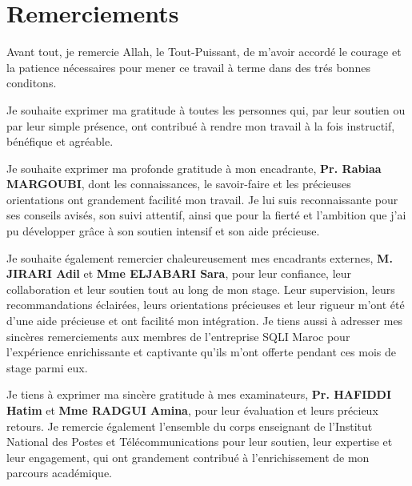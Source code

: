 \chapter*{Remerciements}



Avant tout, je remercie Allah, le Tout-Puissant, de m'avoir accordé le courage et la patience nécessaires pour mener ce travail à terme dans des trés bonnes conditons.

\vspace{10pt}
Je souhaite exprimer ma gratitude à toutes les personnes qui, par leur soutien ou par leur simple présence, ont contribué à rendre mon travail à la fois instructif, bénéfique et agréable.

\vspace{10pt}
Je souhaite exprimer ma profonde gratitude à mon encadrante, \textbf{Pr. Rabiaa MARGOUBI}, dont les connaissances, le savoir-faire et les précieuses orientations ont grandement facilité mon travail. Je lui suis reconnaissante pour ses conseils avisés, son suivi attentif, ainsi que pour la fierté et l'ambition que j'ai pu développer grâce à son soutien intensif et son aide précieuse.

\vspace{10pt}
Je souhaite également remercier chaleureusement mes encadrants externes, \textbf{M. JIRARI Adil} et \textbf{Mme ELJABARI Sara}, pour leur confiance, leur collaboration et leur soutien tout au long de mon stage. Leur supervision, leurs recommandations éclairées, leurs orientations précieuses et leur rigueur m'ont été d'une aide précieuse et ont facilité mon intégration. Je tiens aussi à adresser mes sincères remerciements aux membres de l'entreprise SQLI Maroc pour l'expérience enrichissante et captivante qu'ils m'ont offerte pendant ces mois de stage parmi eux.

\vspace{10pt}
Je tiens à exprimer ma sincère gratitude à mes examinateurs, \textbf{Pr. HAFIDDI Hatim} et \textbf{Mme RADGUI Amina}, pour leur évaluation et leurs précieux retours. Je remercie également l'ensemble du corps enseignant de l’Institut National des Postes et Télécommunications pour leur soutien, leur expertise et leur engagement, qui ont grandement contribué à l’enrichissement de mon parcours académique.